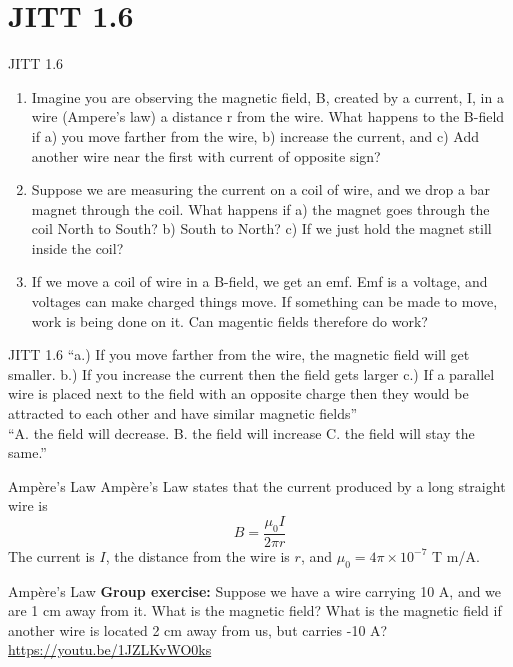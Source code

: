 \documentclass{beamer}
\begin{document}
\section{JITT 1.6}

\begin{frame}{JITT 1.6}
\small
\begin{enumerate}
\item  Imagine you are observing the magnetic field, B, created by a current, I, in a wire (Ampere's law) a distance r from the wire.  What happens to the B-field if a) you move farther from the wire, b) increase the current, and c) Add another wire near the first with current of opposite sign?
\item Suppose we are measuring the current on a coil of wire, and we drop a bar magnet through the coil.  What happens if a) the magnet goes through the coil North to South? b) South to North? c) If we just hold the magnet still inside the coil? 
\item If we move a coil of wire in a B-field, we get an emf.  Emf is a voltage, and voltages can make charged things move.  If something can be made to move, work is being done on it.  Can magentic fields therefore do work?
\end{enumerate}
\end{frame}

\begin{frame}{JITT 1.6}
``a.) If you move farther from the wire, the magnetic field will get smaller. b.) If you increase the current then the field gets larger c.) If a parallel wire is placed next to the field with an opposite charge then they would be attracted to each other and have similar magnetic fields'' \\
``A. the field will decrease. B. the field will increase C. the field will stay the same.'' \\
\end{frame}

\begin{frame}{Amp\`{e}re's Law}
Amp\`{e}re's Law states that the current produced by a long straight wire is
\begin{equation}
B = \frac{\mu_0 I}{2\pi r}
\end{equation}
The current is $I$, the distance from the wire is $r$, and $\mu_0 = 4\pi \times 10^{-7}$ T m/A.
\end{frame}

\begin{frame}{Amp\`{e}re's Law}
\textbf{Group exercise:} Suppose we have a wire carrying 10 A, and we are 1 cm away from it.  What is the magnetic field?  What is the magnetic field if another wire is located 2 cm away from us, but carries -10 A? \\ \vspace{1cm}
\url{https://youtu.be/1JZLKvWO0ks}
\end{frame}
\end{document}
